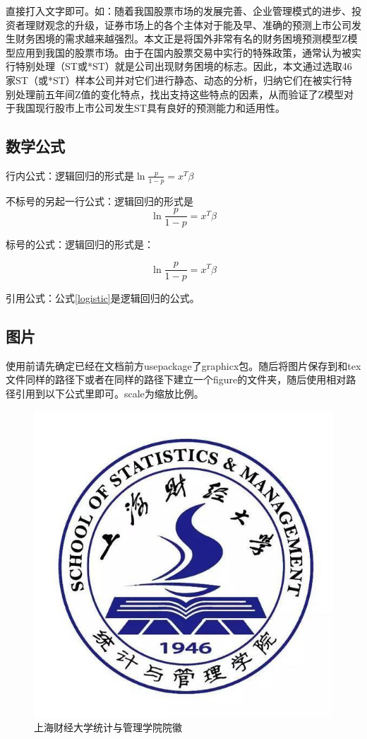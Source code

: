 \documentclass[UTF8,a4paper,10.5pt]{ctexart}
\begin{document}
直接打入文字即可。如：随着我国股票市场的发展完善、企业管理模式的进步、投资者理财观念的升级，证券市场上的各个主体对于能及早、准确的预测上市公司发生财务困境的需求越来越强烈。本文正是将国外非常有名的财务困境预测模型Z模型应用到我国的股票市场。由于在国内股票交易中实行的特殊政策，通常认为被实行特别处理（ST或*ST）就是公司出现财务困境的标志。因此，本文通过选取46家ST（或*ST）样本公司并对它们进行静态、动态的分析，归纳它们在被实行特别处理前五年间Z值的变化特点，找出支持这些特点的因素，从而验证了Z模型对于我国现行股市上市公司发生ST具有良好的预测能力和适用性。


\subsection{数学公式}
行内公式：逻辑回归的形式是$\ln\frac{p}{1-p}=x^T\beta$

不标号的另起一行公式：逻辑回归的形式是
$$\ln\frac{p}{1-p}=x^T\beta$$

标号的公式：逻辑回归的形式是：

\begin{equation}
	\ln\frac{p}{1-p}=x^T\beta
	\label{logistic}
\end{equation}

引用公式：公式\ref{logistic}是逻辑回归的公式。

\subsection{图片}
使用前请先确定已经在文档前方usepackage了graphicx包。随后将图片保存到和tex文件同样的路径下或者在同样的路径下建立一个figure的文件夹，随后使用相对路径引用到以下公式里即可。scale为缩放比例。

\begin{figure}[h]
	\centering\includegraphics[scale=0.4]{sufestat.jpg}
	\caption{上海财经大学统计与管理学院院徽}
	\label{sufestat}
\end{figure}
	
\end{document}
